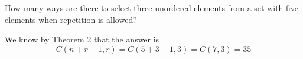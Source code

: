 \documentclass[../main.tex]{subfiles}
\begin{document}
How many ways are there to select three unordered elements from a set with five elements when repetition is allowed?

\solution
We know by Theorem 2 that the answer is
\[
	C(n + r - 1, r)
	=
	C(5 + 3 - 1, 3)
	=
	C(7, 3)
	=
	35
\]
\end{document}
